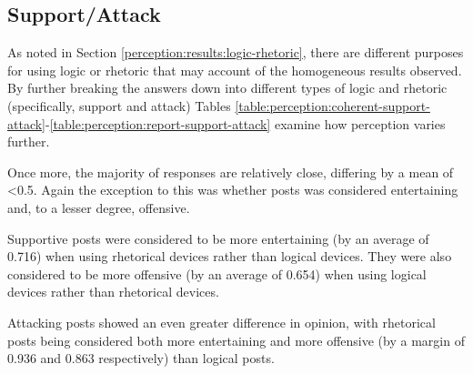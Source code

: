 \subsection{Support/Attack}
\label{perception:results:support-attack}
As noted in Section \ref{perception:results:logic-rhetoric}, there are different purposes for using logic or rhetoric that may account of the homogeneous results observed. By further breaking the answers down into different types of logic and rhetoric (specifically, support and attack) Tables \ref{table:perception:coherent-support-attack}-\ref{table:perception:report-support-attack} examine how perception varies further.



Once more, the majority of responses are relatively close, differing by a mean of \textless0.5. Again the exception to this was whether posts was considered entertaining and, to a lesser degree, offensive. 

Supportive posts were considered to be more entertaining (by an average of 0.716) when using rhetorical devices rather than logical devices. They were also considered to be more offensive (by an average of 0.654) when using logical devices rather than rhetorical devices.

Attacking posts showed an even greater difference in opinion, with rhetorical posts being considered both more entertaining and more offensive (by a margin of 0.936 and 0.863 respectively) than logical posts.


